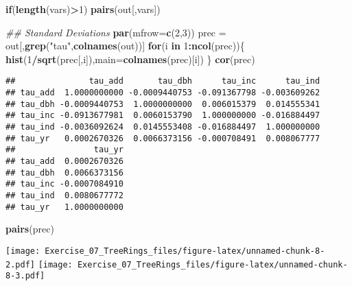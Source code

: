 \documentclass[]{article}
\newenvironment{Shaded}{\begin{snugshade}}{\end{snugshade}}
\newcommand{\CommentTok}[1]{\textcolor[rgb]{0.56,0.35,0.01}{\textit{#1}}}
\newcommand{\ControlFlowTok}[1]{\textcolor[rgb]{0.13,0.29,0.53}{\textbf{#1}}}
\newcommand{\DataTypeTok}[1]{\textcolor[rgb]{0.13,0.29,0.53}{#1}}
\newcommand{\DecValTok}[1]{\textcolor[rgb]{0.00,0.00,0.81}{#1}}
\newcommand{\KeywordTok}[1]{\textcolor[rgb]{0.13,0.29,0.53}{\textbf{#1}}}
\newcommand{\NormalTok}[1]{#1}
\newcommand{\OperatorTok}[1]{\textcolor[rgb]{0.81,0.36,0.00}{\textbf{#1}}}
\newcommand{\StringTok}[1]{\textcolor[rgb]{0.31,0.60,0.02}{#1}}
\begin{document}
\begin{Shaded}
\begin{Highlighting}[]
  \ControlFlowTok{if}\NormalTok{(}\KeywordTok{length}\NormalTok{(vars)}\OperatorTok{>}\DecValTok{1}\NormalTok{) }\KeywordTok{pairs}\NormalTok{(out[,vars])}

  \CommentTok{## Standard Deviations}
  \KeywordTok{par}\NormalTok{(}\DataTypeTok{mfrow=}\KeywordTok{c}\NormalTok{(}\DecValTok{2}\NormalTok{,}\DecValTok{3}\NormalTok{))}
\NormalTok{  prec =}\StringTok{ }\NormalTok{out[,}\KeywordTok{grep}\NormalTok{(}\StringTok{"tau"}\NormalTok{,}\KeywordTok{colnames}\NormalTok{(out))]}
  \ControlFlowTok{for}\NormalTok{(i }\ControlFlowTok{in} \DecValTok{1}\OperatorTok{:}\KeywordTok{ncol}\NormalTok{(prec))\{}
    \KeywordTok{hist}\NormalTok{(}\DecValTok{1}\OperatorTok{/}\KeywordTok{sqrt}\NormalTok{(prec[,i]),}\DataTypeTok{main=}\KeywordTok{colnames}\NormalTok{(prec)[i])}
\NormalTok{  \}}
  \KeywordTok{cor}\NormalTok{(prec)}
\end{Highlighting}
\end{Shaded}

\begin{verbatim}
##               tau_add       tau_dbh      tau_inc      tau_ind
## tau_add  1.0000000000 -0.0009440753 -0.091367798 -0.003609262
## tau_dbh -0.0009440753  1.0000000000  0.006015379  0.014555341
## tau_inc -0.0913677981  0.0060153790  1.000000000 -0.016884497
## tau_ind -0.0036092624  0.0145553408 -0.016884497  1.000000000
## tau_yr   0.0002670326  0.0066373156 -0.000708491  0.008067777
##                tau_yr
## tau_add  0.0002670326
## tau_dbh  0.0066373156
## tau_inc -0.0007084910
## tau_ind  0.0080677772
## tau_yr   1.0000000000
\end{verbatim}

\begin{Shaded}
\begin{Highlighting}[]
  \KeywordTok{pairs}\NormalTok{(prec)}
\end{Highlighting}
\end{Shaded}

\texttt{[image: Exercise\_07\_TreeRings\_files/figure-latex/unnamed-chunk-8-2.pdf]}
\texttt{[image: Exercise\_07\_TreeRings\_files/figure-latex/unnamed-chunk-8-3.pdf]}
\end{document}
